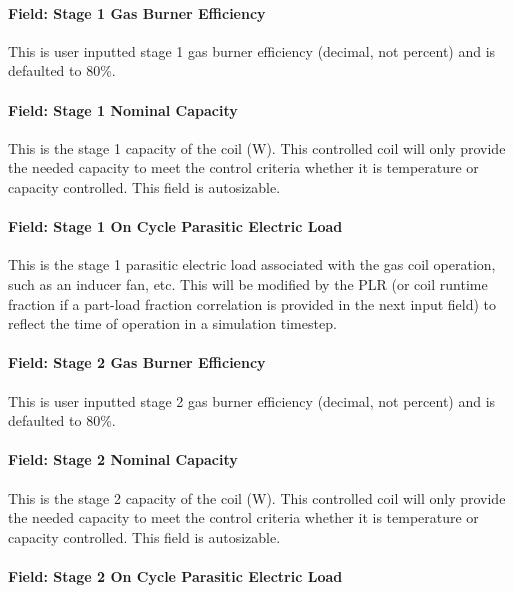 \paragraph{Field: Stage 1 Gas Burner Efficiency}\label{field-stage-1-gas-burner-efficiency}

This is user inputted stage 1 gas burner efficiency (decimal, not percent) and is defaulted to 80\%.

\paragraph{Field: Stage 1 Nominal Capacity}\label{field-stage-1-nominal-capacity-1}

This is the stage 1 capacity of the coil (W). This controlled coil will only provide the needed capacity to meet the control criteria whether it is temperature or capacity controlled. This field is autosizable.

\paragraph{Field: Stage 1 On Cycle Parasitic Electric Load}\label{field-stage-1-parasitic-electric-load}

This is the stage 1 parasitic electric load associated with the gas coil operation, such as an inducer fan, etc. This will be modified by the PLR (or coil runtime fraction if a part-load fraction correlation is provided in the next input field) to reflect the time of operation in a simulation timestep.

\paragraph{Field: Stage 2 Gas Burner Efficiency}\label{field-stage-2-gas-burner-efficiency}

This is user inputted stage 2 gas burner efficiency (decimal, not percent) and is defaulted to 80\%.

\paragraph{Field: Stage 2 Nominal Capacity}\label{field-stage-2-nominal-capacity-1}

This is the stage 2 capacity of the coil (W). This controlled coil will only provide the needed capacity to meet the control criteria whether it is temperature or capacity controlled. This field is autosizable.

\paragraph{Field: Stage 2 On Cycle Parasitic Electric Load}\label{field-stage-2-parasitic-electric-load}

